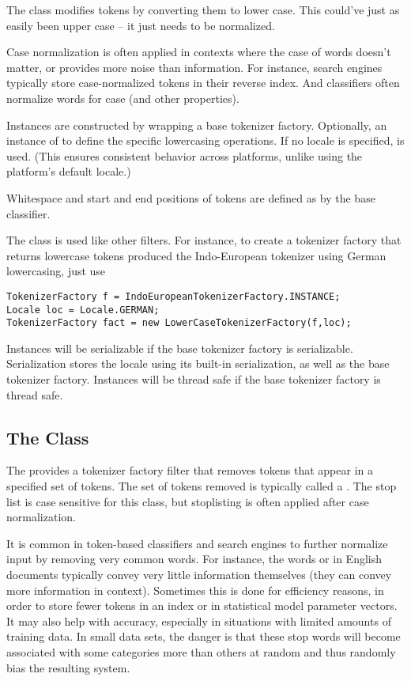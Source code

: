 The  class modifies tokens by
converting them to lower case.  This could've just as easily been
upper case -- it just needs to be normalized.

Case normalization is often applied in contexts where the case of
words doesn't matter, or provides more noise than information.  For
instance, search engines typically store case-normalized tokens in
their reverse index.  And classifiers often normalize words for
case (and other properties).

Instances are constructed by wrapping a base tokenizer factory.
Optionally, an instance of  to define the specific
lowercasing operations.  If no locale is specified,
 is used.  (This ensures consistent behavior
across platforms, unlike using the platform's default locale.)

Whitespace and start and end positions of tokens are defined
as by the base classifier.

The class is used like other filters.  For instance, to create a
tokenizer factory that returns lowercase tokens produced the
Indo-European tokenizer using German lowercasing, just use
%
\begin{verbatim}
TokenizerFactory f = IndoEuropeanTokenizerFactory.INSTANCE;
Locale loc = Locale.GERMAN;
TokenizerFactory fact = new LowerCaseTokenizerFactory(f,loc);
\end{verbatim}

Instances will be serializable if the base tokenizer factory is
serializable.  Serialization stores the locale using its built-in
serialization, as well as the base tokenizer factory.  Instances will
be thread safe if the base tokenizer factory is thread safe.


\subsection{The  Class}

The  provides a tokenizer factory filter
that removes tokens that appear in a specified set of tokens.  The set
of tokens removed is typically called a .
The stop list is case sensitive for this class, but stoplisting is
often applied after case normalization.

It is common in token-based classifiers and search engines to further
normalize input by removing very common words.  For instance, the
words  or  in English documents
typically convey very little information themselves (they can convey
more information in context).  Sometimes this is done for efficiency
reasons, in order to store fewer tokens in an index or in statistical
model parameter vectors.  It may also help with accuracy, especially
in situations with limited amounts of training data.  In small data
sets, the danger is that these stop words will become associated with
some categories more than others at random and thus randomly bias
the resulting system.

